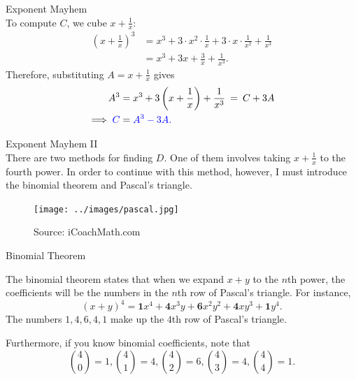 \documentclass[xcolor=dvipsnames, fontsize=11pt, %
pagesize, %
parskip=half-, t]{beamer}
\begin{document}
\begin{frame}{Exponent Mayhem}
	 ~\\
	
To compute $C$, we cube $x+\frac{1}{x}$: \begin{align*} (x+\frac{1}{x})^3&=x^3+3\cdot x^2\cdot \frac{1}{x}+3\cdot x\cdot \frac{1}{x^2}+\frac{1}{x^3} \\ &= x^3+3x+\frac{3}{x}+\frac{1}{x^3}. \end{align*}
Therefore, substituting $A=x+\frac{1}{x}$ gives \begin{align*} A^3&=x^3+3\left(x+\frac{1}{x}\right)+\frac{1}{x^3} \:=\:C+3A \\ \implies \color{blue} C &= \color{blue} A^3-3A. \end{align*}
\end{frame}

\begin{frame}{Exponent Mayhem II}
		 ~\\
		
		There are two methods for finding $D$. One of them involves taking $x+\frac{1}{x}$ to the fourth power. In order to continue with this method, however, I must introduce the binomial theorem and Pascal's triangle.  
		
		\begin{figure}[h]
			\centering\texttt{[image: ../images/pascal.jpg]}
			\caption{Source:  iCoachMath.com}
		\end{figure}
\end{frame}

\begin{frame}{Binomial Theorem}

		The binomial theorem states that when we expand $x+y$ to the $n$th power, the coefficients will be the numbers in the $n$th row of Pascal's triangle. For instance, $$(x+y)^4=\textbf{1}x^4+\textbf{4}x^3y+\textbf{6}x^2y^2+\textbf{4}xy^3+\textbf{1}y^4.$$
		The numbers $1, 4, 6, 4, 1$ make up the $4$th row of Pascal's triangle. \medskip 
		
		Furthermore, if you know binomial coefficients, note that $$\binom{4}{0}=1, \binom{4}{1}=4, \binom{4}{2}=6, \binom{4}{3}=4, \binom{4}{4}=1.$$
		
\end{frame}
\end{document}
